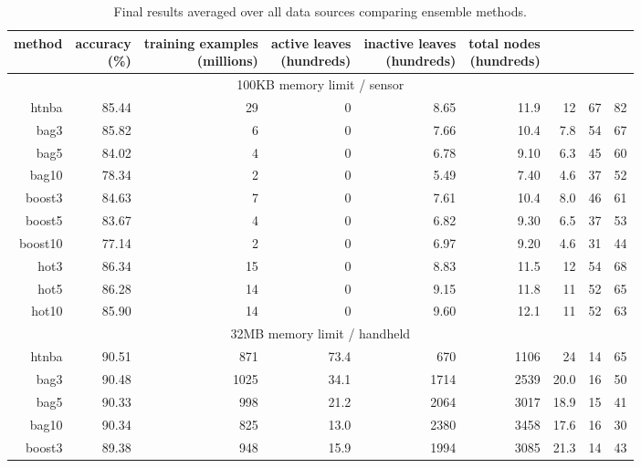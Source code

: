 \begin{table}
\caption{Final results averaged over all data sources comparing ensemble methods.}
\label{tab:ensavgs}
\centering
\begin{tabular}{|r|r|r|r|r|r|r|r|r|}
\hline
method	&
\rotatebox{90}{\parbox{9em}{accuracy\\(\%)}} &
\rotatebox{90}{\parbox{9em}{training examples\\(millions)}} &
\rotatebox{90}{\parbox{9em}{active leaves\\(hundreds)}} &
\rotatebox{90}{\parbox{9em}{inactive leaves\\(hundreds)}} &
\rotatebox{90}{\parbox{9em}{total nodes\\(hundreds)}} &
\rotatebox{90}{\parbox{9em}{(average) tree depth}}	&
\rotatebox{90}{\parbox{9em}{training speed (\%)}} &
\rotatebox{90}{\parbox{9em}{prediction speed (\%)}} \\
\hline
\multicolumn{9}{|c|}{100KB memory limit / sensor} \\
\hline
{\sc htnba} & 85.44 & 29 & 0 & 8.65 & 11.9 & 12 & 67 & 82 \\
{\sc bag3} & 85.82 & 6 & 0 & 7.66 & 10.4 & 7.8 & 54 & 67 \\
{\sc bag5} & 84.02 & 4 & 0 & 6.78 & 9.10 & 6.3 & 45 & 60 \\
{\sc bag10} & 78.34 & 2 & 0 & 5.49 & 7.40 & 4.6 & 37 & 52 \\
{\sc boost3} & 84.63 & 7 & 0 & 7.61 & 10.4 & 8.0 & 46 & 61 \\
{\sc boost5} & 83.67 & 4 & 0 & 6.82 & 9.30 & 6.5 & 37 & 53 \\
{\sc boost10} & 77.14 & 2 & 0 & 6.97 & 9.20 & 4.6 & 31 & 44 \\
{\sc hot3} & 86.34 & 15 & 0 & 8.83 & 11.5 & 12 & 54 & 68 \\
{\sc hot5} & 86.28 & 14 & 0 & 9.15 & 11.8 & 11 & 52 & 65 \\
{\sc hot10} & 85.90 & 14 & 0 & 9.60 & 12.1 & 11 & 52 & 63 \\
\hline
\multicolumn{9}{|c|}{32MB memory limit / handheld} \\
\hline
{\sc htnba} & 90.51 & 871 & 73.4 & 670 & 1106 & 24 & 14 & 65 \\
{\sc bag3} & 90.48 & 1025 & 34.1 & 1714 & 2539 & 20.0 & 16 & 50 \\
{\sc bag5} & 90.33 & 998 & 21.2 & 2064 & 3017 & 18.9 & 15 & 41 \\
{\sc bag10} & 90.34 & 825 & 13.0 & 2380 & 3458 & 17.6 & 16 & 30 \\
{\sc boost3} & 89.38 & 948 & 15.9 & 1994 & 3085 & 21.3 & 14 & 43 \\

\end{tabular}
\end{table}
